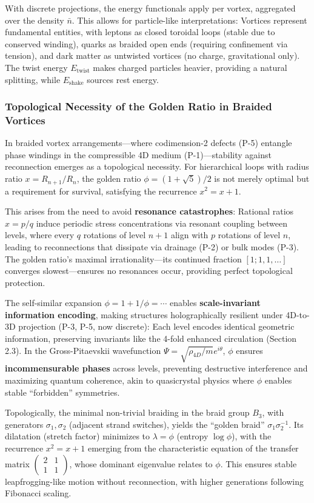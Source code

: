 With discrete projections, the energy functionals apply per vortex, aggregated over the density $\bar{n}$. This allows for particle-like interpretations: Vortices represent fundamental entities, with leptons as closed toroidal loops (stable due to conserved winding), quarks as braided open ends (requiring confinement via tension), and dark matter as untwisted vortices (no charge, gravitational only). The twist energy $E_{\text{twist}}$ makes charged particles heavier, providing a natural splitting, while $E_{\text{shake}}$ sources rest energy.

\subsubsection{Topological Necessity of the Golden Ratio in Braided Vortices}

In braided vortex arrangements---where codimension-2 defects (P-5) entangle phase windings in the compressible 4D medium (P-1)---stability against reconnection emerges as a topological necessity. For hierarchical loops with radius ratio $x = R_{n+1}/R_n$, the golden ratio $\phi = (1 + \sqrt{5})/2$ is not merely optimal but a requirement for survival, satisfying the recurrence $x^2 = x + 1$.

This arises from the need to avoid \textbf{resonance catastrophes}: Rational ratios $x = p/q$ induce periodic stress concentrations via resonant coupling between levels, where every $q$ rotations of level $n+1$ align with $p$ rotations of level $n$, leading to reconnections that dissipate via drainage (P-2) or bulk modes (P-3). The golden ratio's maximal irrationality---its continued fraction $[1; 1, 1, \ldots]$ converges slowest---ensures no resonances occur, providing perfect topological protection.

The self-similar expansion $\phi = 1 + 1/\phi = \cdots$ enables \textbf{scale-invariant information encoding}, making structures holographically resilient under 4D-to-3D projection (P-3, P-5, now discrete): Each level encodes identical geometric information, preserving invariants like the 4-fold enhanced circulation (Section 2.3). In the Gross-Pitaevskii wavefunction $\Psi = \sqrt{\rho_{4D}/m} e^{i \theta}$, $\phi$ ensures \textbf{incommensurable phases} across levels, preventing destructive interference and maximizing quantum coherence, akin to quasicrystal physics where $\phi$ enables stable ``forbidden'' symmetries.

Topologically, the minimal non-trivial braiding in the braid group $B_3$, with generators $\sigma_1, \sigma_2$ (adjacent strand switches), yields the ``golden braid'' $\sigma_1 \sigma_2^{-1}$. Its dilatation (stretch factor) minimizes to $\lambda = \phi$ (entropy $\log \phi$), with the recurrence $x^2 = x + 1$ emerging from the characteristic equation of the transfer matrix $\begin{pmatrix} 2 & 1 \\ 1 & 1 \end{pmatrix}$, whose dominant eigenvalue relates to $\phi$. This ensures stable leapfrogging-like motion without reconnection, with higher generations following Fibonacci scaling.


